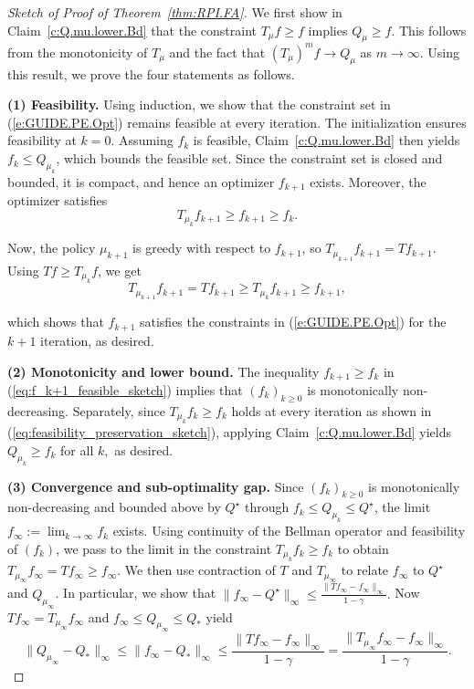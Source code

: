 \documentclass[twoside]{article}
\theoremstyle{plain}
\theoremstyle{definition}
\theoremstyle{remark}
\newcommand{\QS}{Q_*}
\renewcommand{\eqref}[1]{(\ref{#1})}
\begin{document}
\begin{proof}[Sketch of Proof of Theorem~\ref{thm:RPI.FA}]
%
We first show in Claim~\ref{c:Q.mu.lower.Bd} that the constraint $T_\mu f \ge f$ implies $Q_\mu \ge f$. 
This follows from the monotonicity of $T_\mu$ and the fact that $(T_\mu)^m f \to Q_\mu$ as $m \to \infty$. Using this result, we prove the four statements as follows. 

\textbf{(1) Feasibility.}
Using induction, we show that the constraint set in \eqref{e:GUIDE.PE.Opt} remains feasible at every iteration. 
The initialization ensures feasibility at $k=0$. 
Assuming $f_k$ is feasible, Claim~\ref{c:Q.mu.lower.Bd} then yields $f_k \le Q_{\mu_k}$, which bounds the feasible set. 
Since the constraint set is closed and bounded, it is compact, and hence an optimizer $f_{k+1}$ exists. 
Moreover, the optimizer satisfies
%
\begin{equation}
\label{eq:f_k+1_feasible_sketch}
T_{\mu_k} f_{k+1} \ge f_{k+1} \ge f_k.
\end{equation}

Now, the policy $\mu_{k+1}$ is greedy with respect to $f_{k+1}$, so $T_{\mu_{k+1}} f_{k+1} = T f_{k+1}$. 
Using $T f \ge T_{\mu_k} f$, we get
\begin{equation}
\label{eq:feasibility_preservation_sketch}
T_{\mu_{k+1}} f_{k+1} = T f_{k+1} \ge T_{\mu_k} f_{k+1} \ge f_{k+1},
\end{equation}

which shows that $f_{k+1}$ satisfies the constraints in \eqref{e:GUIDE.PE.Opt} for the $k + 1$ iteration, as desired. 

\textbf{(2) Monotonicity and lower bound.}
The inequality $f_{k+1} \ge f_k$ in \eqref{eq:f_k+1_feasible_sketch} implies that $(f_k)_{k \geq 0}$ is monotonically non-decreasing. 
Separately, since $T_{\mu_k} f_k \ge f_k$ holds at every iteration as shown in \eqref{eq:feasibility_preservation_sketch}, applying Claim~\ref{c:Q.mu.lower.Bd} yields $Q_{\mu_k} \ge f_k$ for all $k,$ as desired.

\textbf{(3) Convergence and sub-optimality gap.} Since $(f_k)_{k \geq 0}$ is monotonically non-decreasing and bounded above by $Q^\star$ through $f_k \le Q_{\mu_k} \le Q^\star$, the limit $f_\infty := \lim_{k \to \infty} f_k$ exists. Using continuity of the Bellman operator and feasibility of $(f_k)$, we pass to the limit in the constraint $T_{\mu_k} f_k \ge f_k$ to obtain $T_{\mu_\infty} f_{\infty} = T f_\infty \ge f_\infty.$ We then use contraction of $T$ and $T_{\mu_\infty}$ to relate $f_\infty$ to $Q^\star$ and $Q_{\mu_\infty}$. In particular, we show that $\|f_\infty - Q^\star\|_\infty \leq \frac{\|T f_\infty - f_\infty\|_\infty}{1-\gamma}.$ Now $T f_\infty = T_{\mu_\infty} f_\infty$ and $f_\infty \leq Q_{\mu_\infty} \leq \QS$ yield
%
\begin{equation*}
    \|Q_{\mu_\infty} -  \QS\|_\infty 
    \leq {} \|f_\infty - \QS\|_\infty 
    \leq {}  \frac{\|T f_\infty - f_\infty\|_\infty}{1 - \gamma} = {} \frac{\|T_{\mu_\infty} f_\infty - f_\infty\|_\infty}{1 - \gamma}.
\end{equation*}


\end{proof}
\end{document}
